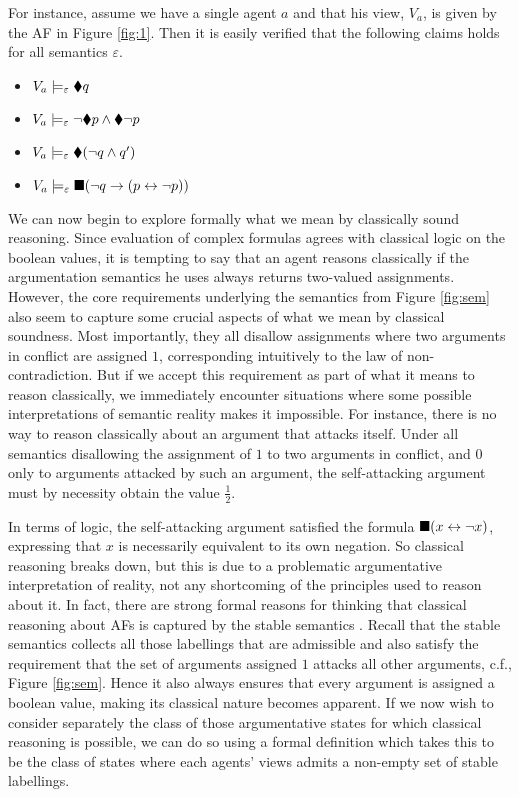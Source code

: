 \documentclass[greybox]{svmult}
\newcommand{\sem}{\varepsilon}
\begin{document}
For instance, assume we have a single agent $a$ and that his view, $V_a$, is given by the AF in Figure \ref{fig:1}. Then it is easily verified that the following claims holds for all semantics $\sem$.
\begin{itemize}
\item $V_a \models_\sem \cdia q$
\item $V_a \models_\sem \neg \cdia p \land \cdia \neg p$
\item $V_a \models_\sem \cdia (\neg q \land q')$
\item $V_a \models_\sem \cbox (\neg q \to (p \leftrightarrow \neg p))$
\end{itemize}

We can now begin to explore formally what we mean by classically sound reasoning. Since evaluation of complex formulas agrees with classical logic on the boolean values, it is tempting to say that an agent reasons classically if the argumentation semantics he uses always returns two-valued assignments. However, the core requirements underlying the semantics from Figure \ref{fig:sem} also seem to capture some crucial aspects of what we mean by classical soundness. Most importantly, they all disallow assignments where two arguments in conflict are assigned $1$, corresponding intuitively to the law of non-contradiction. But if we accept this requirement as part of what it means to reason classically, we immediately encounter situations where some possible interpretations of semantic reality makes it impossible. For instance, there is no way to reason classically about an argument that attacks itself. Under all semantics disallowing the assignment of $1$ to two arguments in conflict, and $0$ only to arguments attacked by such an argument, the self-attacking argument must by necessity obtain the value $\frac{1}{2}$.

In terms of logic, the self-attacking argument satisfied the formula $\blacksquare (x \leftrightarrow \neg x)$, expressing that $x$ is necessarily equivalent to its own negation. So classical reasoning breaks down, but this is due to a problematic argumentative interpretation of reality, not any shortcoming of the principles used to reason about it. In fact, there are strong formal reasons for thinking that classical reasoning about AFs is captured by the stable semantics \cite{dyrkolbotn}. Recall that the stable semantics collects all those labellings that are admissible and also satisfy the requirement that the set of arguments assigned $1$ attacks all other arguments, c.f., Figure \ref{fig:sem}. Hence it also always ensures that every argument is assigned a boolean value, making its classical nature becomes apparent. If we now wish to consider separately the class of those argumentative states for which classical reasoning is possible, we can do so using a formal definition which takes this to be the class of states where each agents' views admits a non-empty set of stable labellings.
\end{document}
